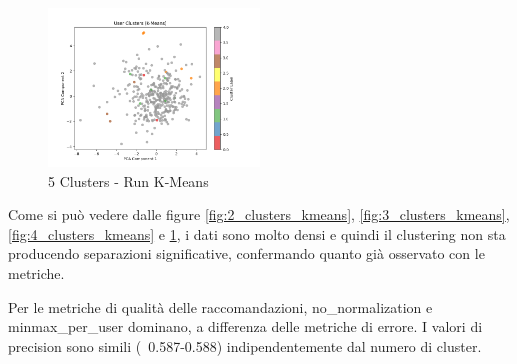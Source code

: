 \begin{figure}[H]
  \centering
  \includegraphics[width=0.5\textwidth]{../output/run_kmeans/images/normalization/simple_centering/hard_clusters/hard_clusters_pca_c5_m2.0_kmeans_maximum_pearson.png}
  \caption{5 Clusters - Run K-Means}
  \label{fig:5_clusters_kmeans}
\end{figure}

Come si può vedere dalle figure \ref{fig:2_clusters_kmeans}, \ref{fig:3_clusters_kmeans}, \ref{fig:4_clusters_kmeans} e \ref{fig:5_clusters_kmeans}, i dati sono molto densi e quindi il clustering non sta producendo separazioni significative, confermando quanto già osservato con le metriche.

\begin{table}[H]
  \centering
  \caption{Top 5 Configurazioni per Train Precision - Run K-Means}
\end{table}

Per le metriche di qualità delle raccomandazioni, no\_normalization e minmax\_per\_user dominano, a differenza delle metriche di errore. I valori di precision sono simili (~0.587-0.588) indipendentemente dal numero di cluster.

